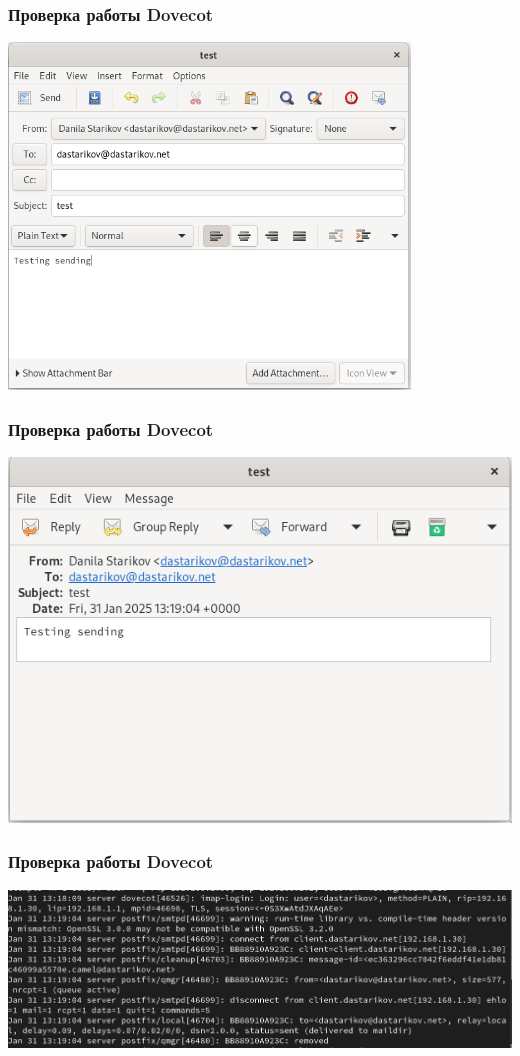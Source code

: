\begin{frame}
\frametitle{Проверка работы Dovecot}
    \centering
    \includegraphics[width=0.8\textwidth]{../images/image14.png}
\end{frame}

\begin{frame}
\frametitle{Проверка работы Dovecot}
    \centering
    \includegraphics[width=\textwidth]{../images/image15.png}
\end{frame}

\begin{frame}
\frametitle{Проверка работы Dovecot}
    \centering
    \includegraphics[width=\textwidth]{../images/image16.png}
\end{frame}

